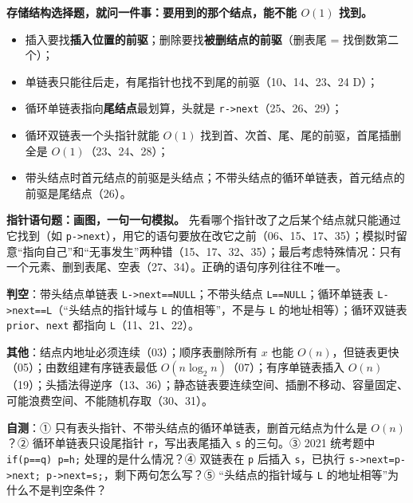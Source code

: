 \documentclass[10.5pt,a4paper,oneside]{article}
\providecommand{\tightlist}{\setlength{\itemsep}{2pt}\setlength{\parskip}{0pt}}
\begin{document}
\begin{summarybox}

\textbf{存储结构选择题，就问一件事：要用到的那个结点，能不能 \(O(1)\)
找到。}

\begin{itemize}
\tightlist
\item
  插入要找\textbf{插入位置的前驱}；删除要找\textbf{被删结点的前驱}（删表尾
  = 找倒数第二个）；
\item
  单链表只能往后走，有尾指针也找不到尾的前驱（10、14、23、24 D）；
\item
  循环单链表指向\textbf{尾结点}最划算，头就是
  \texttt{r-\textgreater{}next}（25、26、29）；
\item
  循环双链表一个头指针就能 \(O(1)\)
  找到首、次首、尾、尾的前驱，首尾插删全是 \(O(1)\)（23、24、28）；
\item
  带头结点时首元结点的前驱是头结点；不带头结点的循环单链表，首元结点的前驱是尾结点（26）。
\end{itemize}

\textbf{指针语句题：画图，一句一句模拟。}
先看哪个指针改了之后某个结点就只能通过它找到（如
\texttt{p-\textgreater{}next}），用它的语句要放在改它之前（06、15、17、35）；模拟时留意“指向自己”和“无事发生”两种错（15、17、32、35）；最后考虑特殊情况：只有一个元素、删到表尾、空表（27、34）。正确的语句序列往往不唯一。

\textbf{判空}：带头结点单链表
\texttt{L-\textgreater{}next==NULL}；不带头结点
\texttt{L==NULL}；循环单链表
\texttt{L-\textgreater{}next==L}（“头结点的指针域与 \texttt{L}
的值相等”，不是与 \texttt{L} 的地址相等）；循环双链表
\texttt{prior}、\texttt{next} 都指向 \texttt{L}（11、21、22）。

\textbf{其他}：结点内地址必须连续（03）；顺序表删除所有 \(x\) 也能
\(O(n)\)，但链表更快（05）；由数组建有序链表最低
\(O(n\log_2 n)\)（07）；有序单链表插入
\(O(n)\)（19）；头插法得逆序（13、36）；静态链表要连续空间、插删不移动、容量固定、可能浪费空间、不能随机存取（30、31）。

\textbf{自测}：①
只有表头指针、不带头结点的循环单链表，删首元结点为什么是 \(O(n)\)？②
循环单链表只设尾指针 \texttt{r}，写出表尾插入 \texttt{s} 的三句。③ 2021
统考题中 \texttt{if(p==q)\ p=h;} 处理的是什么情况？④ 双链表在 \texttt{p}
后插入 \texttt{s}，已执行
\texttt{s-\textgreater{}next=p-\textgreater{}next;\ p-\textgreater{}next=s;}，剩下两句怎么写？⑤
“头结点的指针域与 \texttt{L} 的地址相等”为什么不是判空条件？

\end{summarybox}
\end{document}
